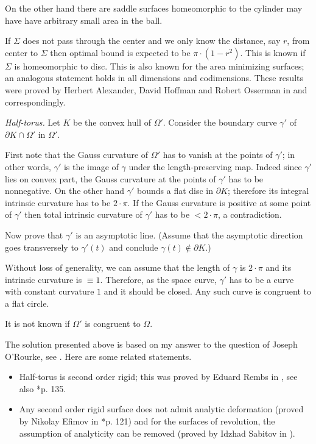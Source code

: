 On the other hand there are saddle surfaces homeomorphic to the cylinder
may have have arbitrary small area in the ball. 

If $\Sigma$ does not pass through the center 
and we only know the distance, say $r$, 
from center to $\Sigma$ 
then optimal bound is expected to be $\pi\cdot(1-r^2)$.
This is known if $\Sigma$ is homeomorphic to  disc.
This is also known for the area minimizing surfaces;
an analogous statement
holds in all dimensions and codimensions.
These results were proved by 
Herbert Alexander, 
David Hoffman
and Robert Osserman in \cite{alexander-osserman} and \cite{alexander-hoffman-osserman} correspondingly.






\textit{Half-torus.}
Let $K$ be the convex hull of $\Omega'$.
Consider the boundary curve $\gamma'$ of $\partial K\cap \Omega'$ in $\Omega'$.

First note that the Gauss curvature of $\Omega'$ has to vanish at the points of $\gamma'$;
in other words, $\gamma'$ is the image of $\gamma$ under the length-preserving map.
Indeed since $\gamma'$ lies on convex part, 
the Gauss curvature at the points of $\gamma'$ has to be nonnegative. 
On the other hand $\gamma'$ bounds a flat disc in $\partial K$;
therefore its integral intrinsic curvature has to be $2{\cdot}\pi$.
If the Gauss curvature is positive at some point of $\gamma'$ then total intrinsic curvature of $\gamma'$ has to be $<2{\cdot}\pi$, a contradiction.

Now prove that $\gamma'$ is an asymptotic line.
(Assume that the asymptotic direction goes transversely to $\gamma'(t)$ and conclude $\gamma(t)\notin\partial K$.)

Without loss of generality, we can assume that the length of $\gamma$ is $2{\cdot}\pi$ and its intrinsic curvature is $\equiv 1$.
Therefore, as the space curve,
$\gamma'$ has to be a curve with constant curvature $1$ and it should be closed.
Any such curve is congruent to a flat circle.

 It is not known if $\Omega'$ is congruent to $\Omega$.

The solution presented above is based on my answer 
to the question of Joseph O'Rourke, see \cite{rourke}.
Here are some related statements.
\begin{itemize}
\item Half-torus is second order rigid;
this was proved by Eduard Rembs in
\cite{rembs}, see also \cite{efimov}*{p. 135}.
\item Any second order rigid surface does not admit analytic deformation (proved by Nikolay Efimov in \cite{efimov}*{p. 121})
and for the surfaces of revolution, the assumption of analyticity can be removed (proved by Idzhad Sabitov in \cite{sabitov}).
\end{itemize}






